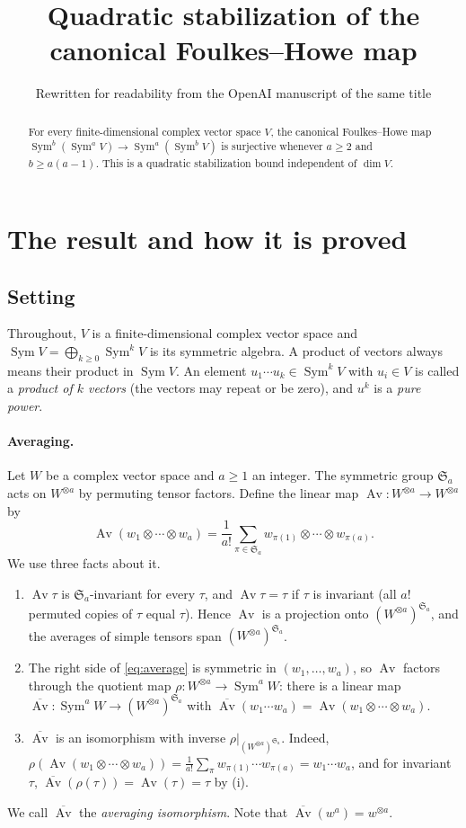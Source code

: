\documentclass[11pt]{article}
\title{Quadratic stabilization of the canonical Foulkes--Howe map}
\author{Rewritten for readability from the OpenAI manuscript of the same title}
\date{}
\theoremstyle{definition}
\theoremstyle{remark}
\DeclareMathOperator{\Sym}{Sym}
\DeclareMathOperator{\Av}{Av}
\newcommand{\Sa}{\mathfrak S_a}
\begin{document}
\maketitle
\begin{abstract}
For every finite-dimensional complex vector space $V$, the canonical
Foulkes--Howe map $\Sym^b(\Sym^a V)\longrightarrow\Sym^a(\Sym^b V)$ is
surjective whenever $a\ge2$ and $b\ge a(a-1)$. This is a quadratic
stabilization bound independent of $\dim V$.
\end{abstract}

\section{The result and how it is proved}\label{sec:introduction}

\subsection{Setting}

Throughout, $V$ is a finite-dimensional complex vector space and
$\Sym V=\bigoplus_{k\ge0}\Sym^kV$ is its symmetric algebra. A product of
vectors always means their product in $\Sym V$. An element
$u_1\cdots u_k\in\Sym^kV$ with $u_i\in V$ is called a \emph{product of $k$
vectors} (the vectors may repeat or be zero), and $u^k$ is a \emph{pure
power}.

\paragraph{Averaging.}
Let $W$ be a complex vector space and $a\ge1$ an integer. The symmetric group
$\Sa$ acts on $W^{\otimes a}$ by permuting tensor factors. Define the
linear map $\Av\colon W^{\otimes a}\to W^{\otimes a}$ by
\begin{equation}\label{eq:average}
 \Av(w_1\otimes\cdots\otimes w_a)
 =\frac1{a!}\sum_{\pi\in\Sa}
 w_{\pi(1)}\otimes\cdots\otimes w_{\pi(a)}.
\end{equation}
We use three facts about it.
\begin{enumerate}[label=(\roman*),nosep]
\item $\Av\tau$ is $\Sa$-invariant for every $\tau$, and $\Av\tau=\tau$ if
$\tau$ is invariant (all $a!$ permuted copies of $\tau$ equal $\tau$).
Hence $\Av$ is a projection onto $(W^{\otimes a})^{\Sa}$, and the averages
of simple tensors span $(W^{\otimes a})^{\Sa}$.
\item The right side of \eqref{eq:average} is symmetric in
$(w_1,\ldots,w_a)$, so $\Av$ factors through the quotient map
$\rho\colon W^{\otimes a}\to\Sym^aW$: there is a linear map
$\overline{\Av}\colon\Sym^aW\to(W^{\otimes a})^{\Sa}$ with
$\overline{\Av}(w_1\cdots w_a)=\Av(w_1\otimes\cdots\otimes w_a)$.
\item $\overline{\Av}$ is an isomorphism with inverse
$\rho|_{(W^{\otimes a})^{\Sa}}$. Indeed,
$\rho(\Av(w_1\otimes\cdots\otimes w_a))=\frac1{a!}\sum_\pi
w_{\pi(1)}\cdots w_{\pi(a)}=w_1\cdots w_a$, and for invariant $\tau$,
$\overline{\Av}(\rho(\tau))=\Av(\tau)=\tau$ by (i).
\end{enumerate}
We call $\overline{\Av}$ the \emph{averaging isomorphism}. Note that
$\overline{\Av}(w^a)=w^{\otimes a}$.
\end{document}
